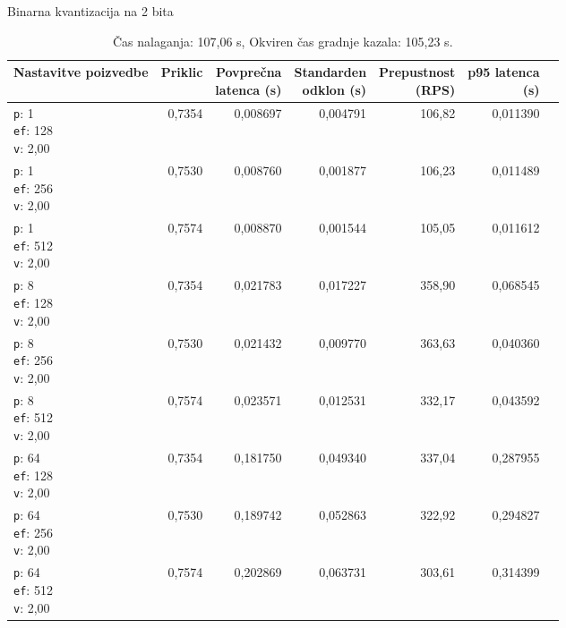 \begin{table}[htbp]
  \centering
\small
  \caption{Binarna kvantizacija na 2 bita}
  \label{tab:single-2cpu-4ram:bq2:qdrant-dipl-baseline-tenant-subgraph-bq2-m16-ef-128-random-768-100-tenants-extended-upload-2026-08-18-07-34-24.json}
  \begin{tabularx}{\textwidth}{Xrrrrrr}
    \toprule
    Nastavitve poizvedbe & Priklic & \makecell{Povprečna\\latenca (s)} & \makecell{Standarden\\odklon (s)} & \makecell{Prepustnost\\(RPS)} & \makecell{p95 latenca\\(s)}  \\
    \midrule
    \makecell{\texttt{p}: 1\\\texttt{ef}: 128\\\texttt{v}: 2,00} & 0,7354 & 0,008697 & 0,004791 & 106,82 & 0,011390 \\
    \makecell{\texttt{p}: 1\\\texttt{ef}: 256\\\texttt{v}: 2,00} & 0,7530 & 0,008760 & 0,001877 & 106,23 & 0,011489 \\
    \makecell{\texttt{p}: 1\\\texttt{ef}: 512\\\texttt{v}: 2,00} & 0,7574 & 0,008870 & 0,001544 & 105,05 & 0,011612 \\
    \makecell{\texttt{p}: 8\\\texttt{ef}: 128\\\texttt{v}: 2,00} & 0,7354 & 0,021783 & 0,017227 & 358,90 & 0,068545 \\
    \makecell{\texttt{p}: 8\\\texttt{ef}: 256\\\texttt{v}: 2,00} & 0,7530 & 0,021432 & 0,009770 & 363,63 & 0,040360 \\
    \makecell{\texttt{p}: 8\\\texttt{ef}: 512\\\texttt{v}: 2,00} & 0,7574 & 0,023571 & 0,012531 & 332,17 & 0,043592 \\
    \makecell{\texttt{p}: 64\\\texttt{ef}: 128\\\texttt{v}: 2,00} & 0,7354 & 0,181750 & 0,049340 & 337,04 & 0,287955 \\
    \makecell{\texttt{p}: 64\\\texttt{ef}: 256\\\texttt{v}: 2,00} & 0,7530 & 0,189742 & 0,052863 & 322,92 & 0,294827 \\
    \makecell{\texttt{p}: 64\\\texttt{ef}: 512\\\texttt{v}: 2,00} & 0,7574 & 0,202869 & 0,063731 & 303,61 & 0,314399 \\
    \bottomrule
  \end{tabularx}
\caption* {Čas nalaganja: 107,06 s, Okviren čas gradnje kazala: 105,23 s.}\end{table}

